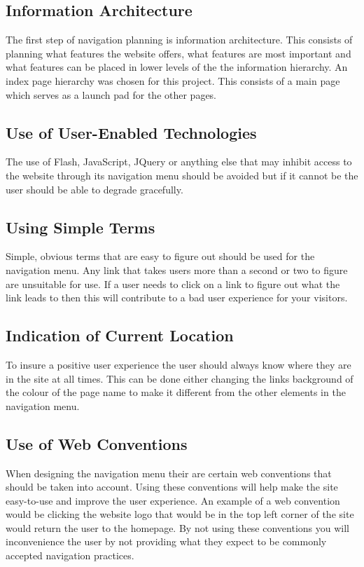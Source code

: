 \documentclass[a4paper, 12pt]{report}
\begin{document}
\subsection{Information Architecture}
The first step of navigation planning is information architecture\cite{IA_101}. This consists of planning what features the website offers, what features are most important and what features can be placed in lower levels of the the information hierarchy. 
An index page hierarchy was chosen for this project. This consists of a main page which serves as a launch pad for the other pages. 

\subsection{Use of User-Enabled Technologies}
The use of Flash, JavaScript, JQuery or anything else that may inhibit access to the website through its navigation menu should be avoided but if it cannot be the user should be able to degrade gracefully\cite{fallback_css_js}.

\subsection{Using Simple Terms}
Simple, obvious terms that are easy to figure out should be used for the navigation menu. Any link that takes users more than a second or two to figure are unsuitable for use. If a user needs to click on a link to figure out what the link leads to then this will contribute to a bad user experience for your visitors. 

\subsection{Indication of Current Location}
To insure a positive user experience the user should always know where they are in the site at all times. This can be done either changing the links background of the colour of the page name to make it different from the other elements in the navigation menu.

\subsection{Use of Web Conventions}
When designing the navigation menu their are certain web conventions\cite{web_design_conventions} that should be taken into account. Using these conventions will help make the site easy-to-use and improve the user experience. An example of a web convention would be clicking the website logo that would be in the top left corner of the site would return the user to the homepage. By not using these conventions you will inconvenience the user by not providing what they expect to be commonly accepted navigation practices.
\end{document}
